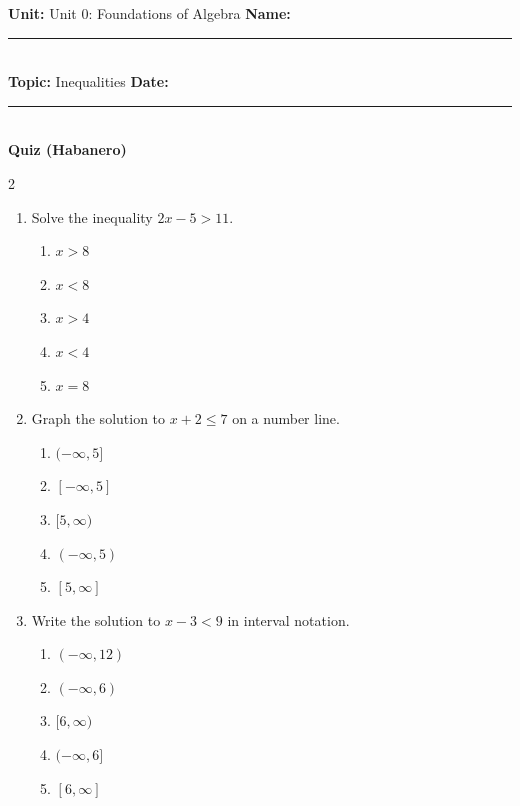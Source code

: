 \documentclass[10pt]{article}
\begin{document}
\enlargethispage{2.5cm}

\begin{tcolorbox}[colback=mainblue!5, colframe=mainblue, sharp corners, boxrule=0.5pt]
    \small \textbf{Unit:} Unit 0: Foundations of Algebra \hfill \textbf{Name:} \rule{3cm}{0.4pt} \\
    \small \textbf{Topic:} Inequalities \hfill \textbf{Date:} \rule{2cm}{0.4pt} \\
    \centering \textbf{\large Quiz (Habanero)}
\end{tcolorbox}

\vspace{0.2cm}

\begin{multicols}{2}
\begin{enumerate}[label=\textbf{Q\arabic*.}, leftmargin=*, itemsep=6pt, parsep=0pt]

  \item \small Solve the inequality $2x - 5 > 11$.
  \begin{enumerate}[label=(\Alph*), leftmargin=0.6cm, nosep, itemsep=2pt]
    \item $x > 8$
    \item $x < 8$
    \item $x > 4$
    \item $x < 4$
    \item $x = 8$
  \end{enumerate}

  \item \small Graph the solution to $x + 2 \leq 7$ on a number line.
  \begin{enumerate}[label=(\Alph*), leftmargin=0.6cm, nosep, itemsep=2pt]
    \item $(-\infty, 5]$
    \item $[-\infty, 5]$
    \item $[5, \infty)$
    \item $(-\infty, 5)$
    \item $[5, \infty]$
  \end{enumerate}

  \item \small Write the solution to $x - 3 < 9$ in interval notation.
  \begin{enumerate}[label=(\Alph*), leftmargin=0.6cm, nosep, itemsep=2pt]
    \item $(-\infty, 12)$
    \item $(-\infty, 6)$
    \item $[6, \infty)$
    \item $(-\infty, 6]$
    \item $[6, \infty]$
  \end{enumerate}


\end{enumerate}
\end{multicols}
\end{document}
